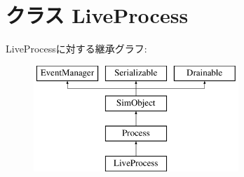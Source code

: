 \hypertarget{classProcess_1_1LiveProcess}{
\section{クラス LiveProcess}
\label{classProcess_1_1LiveProcess}
}
LiveProcessに対する継承グラフ:\begin{figure}[H]
\begin{center}
\leavevmode
\includegraphics[height=4cm]{classProcess_1_1LiveProcess}
\end{center}
\end{figure}
